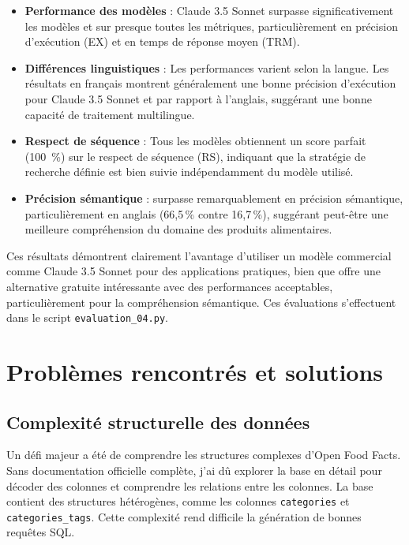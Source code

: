 \documentclass[a4paper,11pt]{article}
\begin{document}
\begin{itemize}
\item \textbf{Performance des modèles} : Claude 3.5 Sonnet surpasse significativement les modèles  et  sur presque toutes les métriques, particulièrement en précision d'exécution (EX) et en temps de réponse moyen (TRM).
\item \textbf{Différences linguistiques} : Les performances varient selon la langue. Les résultats en français montrent généralement une bonne précision d'exécution pour Claude 3.5 Sonnet et  par rapport à l'anglais, suggérant une bonne capacité de traitement multilingue.
\item \textbf{Respect de séquence} : Tous les modèles obtiennent un score parfait (100~\%) sur le respect de séquence (RS), indiquant que la stratégie de recherche définie est bien suivie indépendamment du modèle utilisé.
\item \textbf{Précision sémantique} :  surpasse remarquablement  en précision sémantique, particulièrement en anglais (66,5\,\% contre 16,7\,\%), suggérant peut-être une meilleure compréhension du domaine des produits alimentaires.
\end{itemize}

Ces résultats démontrent clairement l'avantage d'utiliser un modèle commercial comme Claude 3.5 Sonnet pour des applications pratiques, bien que  offre une alternative gratuite intéressante avec des performances acceptables, particulièrement pour la compréhension sémantique.
Ces évaluations s'effectuent dans le script \texttt{evaluation\_04.py}.


\section{Problèmes rencontrés et solutions}
\label{sec:problems}

\subsection{Complexité structurelle des données}

Un défi majeur a été de comprendre les structures complexes d'Open Food Facts. Sans documentation officielle complète, j'ai dû explorer la base en détail pour décoder des colonnes et 
comprendre les relations entre les colonnes.
La base contient des structures hétérogènes, comme les colonnes \texttt{categories} et \texttt{categories\_tags}. Cette complexité rend difficile la génération de bonnes requêtes SQL.
\end{document}
